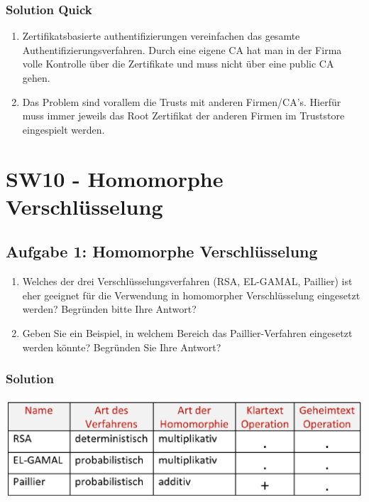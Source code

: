 \documentclass[11pt]{article}
\providecommand{\tightlist}{%
      \setlength{\itemsep}{0pt}\setlength{\parskip}{0pt}}
\begin{document}
\hypertarget{solution-quick}{%
\subsubsection{Solution Quick}\label{solution-quick}}

\begin{enumerate}
\def\labelenumi{\arabic{enumi}.}
\item
  Zertifikatsbasierte authentifizierungen vereinfachen das gesamte
  Authentifizierungsverfahren. Durch eine eigene CA hat man in der Firma
  volle Kontrolle über die Zertifikate und muss nicht über eine public
  CA gehen.
\item
  Das Problem sind vorallem die Trusts mit anderen Firmen/CA's. Hierfür
  muss immer jeweils das Root Zertifikat der anderen Firmen im
  Truststore eingespielt werden.
\end{enumerate}

    

    \hypertarget{sw10---homomorphe-verschluxfcsselung}{%
\section{SW10 - Homomorphe
Verschlüsselung}\label{sw10---homomorphe-verschluxfcsselung}}

    \hypertarget{aufgabe-1-homomorphe-verschluxfcsselung}{%
\subsection{Aufgabe 1: Homomorphe
Verschlüsselung}\label{aufgabe-1-homomorphe-verschluxfcsselung}}

\begin{enumerate}
\def\labelenumi{\arabic{enumi}.}
\tightlist
\item
  Welches der drei Verschlüsselungsverfahren (RSA, EL-GAMAL, Paillier)
  ist eher geeignet für die Verwendung in homomorpher Verschlüsselung
  eingesetzt werden? Begründen bitte Ihre Antwort?
\item
  Geben Sie ein Beispiel, in welchem Bereich das Paillier-Verfahren
  eingesetzt werden könnte? Begründen Sie Ihre Antwort?
\end{enumerate}

\hypertarget{solution}{%
\subsubsection{Solution}\label{solution}}

\begin{center}
	\includegraphics[scale=0.6]{img/algoverview.png}
\end{center}
\end{document}
